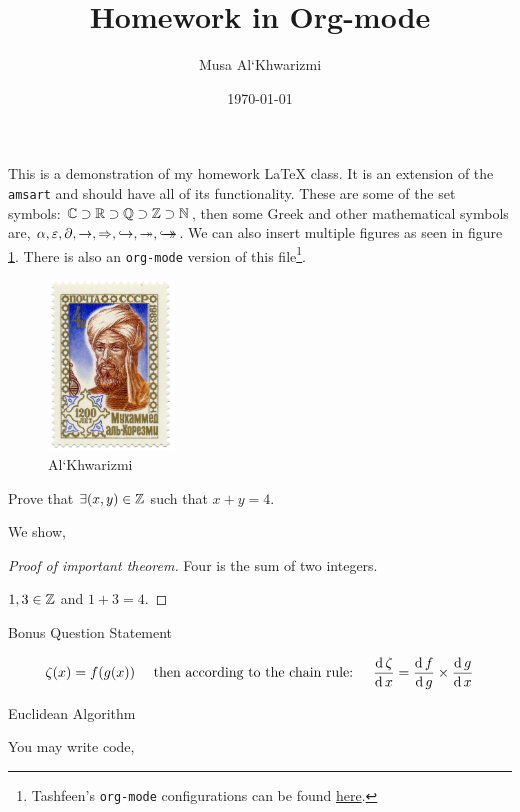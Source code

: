 \documentclass{homework}
\author{Musa Al`Khwarizmi}
\date{\today}
\title{Homework in Org-mode}
\begin{document}
\maketitle
This is a demonstration of my homework \LaTeX{} class. It is an extension of the \texttt{amsart} and should have all of its functionality. These are some of the set symbols: \(\bC \supset \bR \supset \bQ \supset \bZ \supset \bN\), then some Greek and other mathematical symbols are, \(\al, \ep, \p, \ra, \Ra, \injective, \surjective, \bijective\). We can also insert multiple figures as seen in figure \ref{fig:org1c6c388}. There is also an \texttt{org-mode} version of this file\footnote{Tashfeen's \texttt{org-mode} configurations can be found \href{https://github.com/simurgh9/emacs786}{here}.}.

\begin{figure}[htbp]
\centering
\includegraphics[width=0.3\textwidth]{../media/khwarizmi.png}
\caption{\label{fig:org1c6c388}Al`Khwarizmi}
\end{figure}

\begin{question}
Prove that \(\exists (x,y) \in \bZ\) such that \(x+y = 4\).

We show,
\begin{proof}[Proof of important theorem]
Four is the sum of two integers.

\(1,3 \in \bZ\) and \(1+3=4\).
\end{proof}
\end{question}

\begin{bonus}
Bonus Question Statement 

\lipsum[2]
\[
\zeta(x) = f(g(x)) \quad \text{ then according to the chain rule: } \quad
\derivative{\zeta} = \derivative[g]{f} \times \derivative{g}
\]
\end{bonus}


\begin{bonus}
Euclidean Algorithm

You may write code,

\end{bonus}
\end{document}
